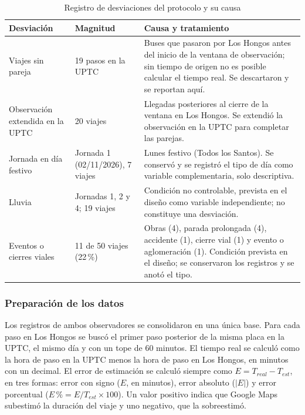 \begin{table}[H]
\centering
\caption{Registro de desviaciones del protocolo y su causa}
\label{tab:desviaciones}
\small
\begin{tabular}{@{}L{3.6cm} L{3.3cm} L{7.5cm}@{}}
\toprule
\textbf{Desviación} & \textbf{Magnitud} & \textbf{Causa y tratamiento} \\
\midrule

Viajes sin pareja & 19 pasos en la UPTC & Buses que pasaron por Los Hongos antes del inicio de la ventana de observación; sin tiempo de origen no es posible calcular el tiempo real. Se descartaron y se reportan aquí. \\
Observación extendida en la UPTC & 20 viajes & Llegadas posteriores al cierre de la ventana en Los Hongos. Se extendió la observación en la UPTC para completar las parejas. \\
Jornada en día festivo & Jornada 1 (02/11/2026), 7 viajes & Lunes festivo (Todos los Santos). Se conservó y se registró el tipo de día como variable complementaria, solo descriptiva. \\
Lluvia & Jornadas 1, 2 y 4; 19 viajes & Condición no controlable, prevista en el diseño como variable independiente; no constituye una desviación. \\
Eventos o cierres viales & 11 de 50 viajes (22\,\%) & Obras (4), parada prolongada (4), accidente (1), cierre vial (1) y evento o aglomeración (1). Condición prevista en el diseño; se conservaron los registros y se anotó el tipo. \\
\bottomrule
\end{tabular}
\end{table}

\subsubsection{Preparación de los datos}

Los registros de ambos observadores se consolidaron en una única base. Para cada paso en Los Hongos se buscó el primer paso posterior de la misma placa en la UPTC, el mismo día y con un tope de 60 minutos. El tiempo real se calculó como la hora de paso en la UPTC menos la hora de paso en Los Hongos, en minutos con un decimal. El error de estimación se calculó siempre como $E = T_{real} - T_{est}$, en tres formas: error con signo ($E$, en minutos), error absoluto ($|E|$) y error porcentual ($E\,\% = E/T_{est} \times 100$). Un valor positivo indica que Google Maps subestimó la duración del viaje y uno negativo, que la sobreestimó.

